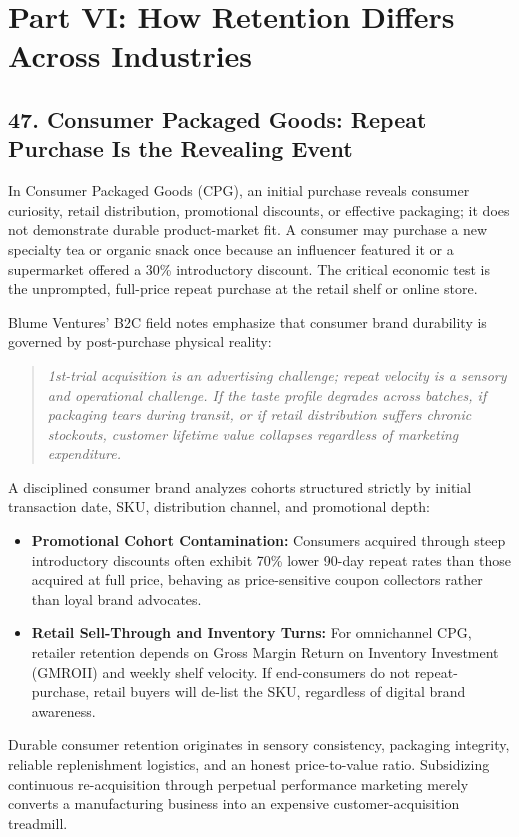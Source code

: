 \section*{Part VI: How Retention Differs Across Industries}

\subsection*{47. Consumer Packaged Goods: Repeat Purchase Is the Revealing Event}

In Consumer Packaged Goods (CPG), an initial purchase reveals consumer curiosity, retail distribution, promotional discounts, or effective packaging; it does not demonstrate durable product-market fit. A consumer may purchase a new specialty tea or organic snack once because an influencer featured it or a supermarket offered a 30\% introductory discount. The critical economic test is the unprompted, full-price repeat purchase at the retail shelf or online store.

Blume Ventures' B2C field notes emphasize that consumer brand durability is governed by post-purchase physical reality:
\begin{quote}
\textit{1st-trial acquisition is an advertising challenge; repeat velocity is a sensory and operational challenge. If the taste profile degrades across batches, if packaging tears during transit, or if retail distribution suffers chronic stockouts, customer lifetime value collapses regardless of marketing expenditure.}
\end{quote}
A disciplined consumer brand analyzes cohorts structured strictly by initial transaction date, SKU, distribution channel, and promotional depth:
\begin{itemize}[leftmargin=*]
\item \textbf{Promotional Cohort Contamination:} Consumers acquired through steep introductory discounts often exhibit 70\% lower 90-day repeat rates than those acquired at full price, behaving as price-sensitive coupon collectors rather than loyal brand advocates.
\item \textbf{Retail Sell-Through and Inventory Turns:} For omnichannel CPG, retailer retention depends on Gross Margin Return on Inventory Investment (GMROII) and weekly shelf velocity. If end-consumers do not repeat-purchase, retail buyers will de-list the SKU, regardless of digital brand awareness.
\end{itemize}

Durable consumer retention originates in sensory consistency, packaging integrity, reliable replenishment logistics, and an honest price-to-value ratio. Subsidizing continuous re-acquisition through perpetual performance marketing merely converts a manufacturing business into an expensive customer-acquisition treadmill.

